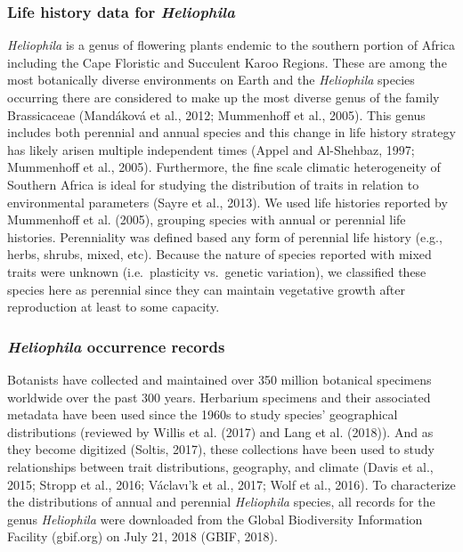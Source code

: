 \documentclass[man,floatsintext]{apa6}
\theoremstyle{definition}
\theoremstyle{definition}
\theoremstyle{definition}
\theoremstyle{remark}
\begin{document}
\hypertarget{life-history-data-for-heliophila}{%
\subsubsection{\texorpdfstring{Life history data for
\emph{Heliophila}}{Life history data for Heliophila}}\label{life-history-data-for-heliophila}}

\emph{Heliophila} is a genus of flowering plants endemic to the southern
portion of Africa including the Cape Floristic and Succulent Karoo
Regions. These are among the most botanically diverse environments on
Earth and the \emph{Heliophila} species occurring there are considered
to make up the most diverse genus of the family Brassicaceae (Mandáková
et al., 2012; Mummenhoff et al., 2005). This genus includes both
perennial and annual species and this change in life history strategy
has likely arisen multiple independent times (Appel and Al-Shehbaz,
1997; Mummenhoff et al., 2005). Furthermore, the fine scale climatic
heterogeneity of Southern Africa is ideal for studying the distribution
of traits in relation to environmental parameters (Sayre et al., 2013).
We used life histories reported by Mummenhoff et al. (2005), grouping
species with annual or perennial life histories. Perenniality was
defined based any form of perennial life history (e.g., herbs, shrubs,
mixed, etc). Because the nature of species reported with mixed traits
were unknown (i.e.~plasticity vs.~genetic variation), we classified
these species here as perennial since they can maintain vegetative
growth after reproduction at least to some capacity.

\hypertarget{heliophila-occurrence-records}{%
\subsubsection{\texorpdfstring{\emph{Heliophila} occurrence
records}{Heliophila occurrence records}}\label{heliophila-occurrence-records}}

Botanists have collected and maintained over 350 million botanical
specimens worldwide over the past 300 years. Herbarium specimens and
their associated metadata have been used since the 1960s to study
species' geographical distributions (reviewed by Willis et al. (2017)
and Lang et al. (2018)). And as they become digitized (Soltis, 2017),
these collections have been used to study relationships between trait
distributions, geography, and climate (Davis et al., 2015; Stropp et
al., 2016; Václavı'k et al., 2017; Wolf et al., 2016). To characterize
the distributions of annual and perennial \emph{Heliophila} species, all
records for the genus \emph{Heliophila} were downloaded from the Global
Biodiversity Information Facility (gbif.org) on July 21, 2018 (GBIF,
2018).
\end{document}
